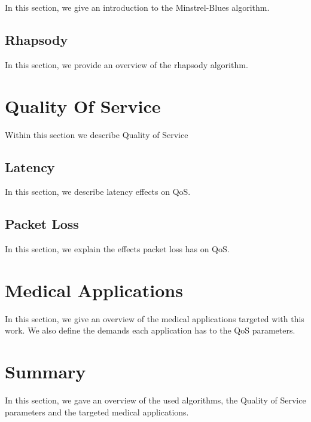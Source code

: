In this section, we give an introduction to the Minstrel-Blues algorithm.

\subsection{Rhapsody}
\label{ss:rhapsody}
%

In this section, we provide an overview of the rhapsody algorithm.


\section{Quality Of Service}
\label{sec:measurement:qos}
%
Within this section we describe Quality of Service

\subsection{Latency}
\label{sec:measurementg:latency}
%
In this section, we describe latency effects on QoS.
%


\subsection{Packet Loss}
\label{sec:measurementg:packetloss}
%
In this section, we explain the effects packet loss has on QoS.
%

%
\section{Medical Applications}

In this section, we give an overview of the medical applications targeted with this work.
We also define the demands each application has to the QoS parameters.
%


\section{Summary}

In this section, we gave an overview of the used algorithms, the Quality of Service parameters and the targeted medical applications.
%


